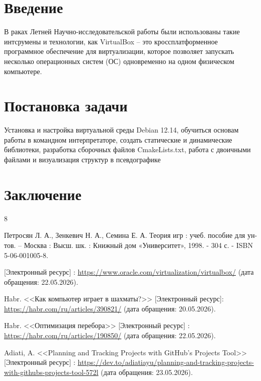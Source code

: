 \documentclass[14pt]{extreport}
\begin{document}
\newpage
\justifying
\newpage
\renewcommand\contentsname{\vspace{-3.2cm}\centering\LargeСодержание}
\tableofcontents
\thispagestyle{empty}
\newpage
{\centering\section*{Введение}}
В раках Летней Научно-исследовательской работы были использованы такие интсрумены и технологии, как VirtualBox -- это кроссплатформенное программное обеспечение для виртуализации, которое позволяет запускать несколько операционных систем (ОС) одновременно на одном физическом компьютере.
\newpage
{\centering\section{Постановка задачи}}
Установка и настройка виртуальной среды Debian 12.14, обучиться основам работы в командном интерпретаторе, создать статические и динамические библиотеки, разработка сборочных файлов CmakeLists.txt, работа с двоичными файлами и визуализация структур в псевдографике 
\newpage
{\centering\section*{Заключение}}

\newpage
\renewcommand{\bibname}{\vspace{-3.2cm}\centering\LargeСписок используемых источников}
\begin{thebibliography}{8}

Петросян Л. А., Зенкевич Н. А., Семина Е. А. Теория игр : учеб. пособие для ун-тов. -- Москва : Высш. шк. : Книжный дом «Университет», 1998. - 304 с. - ISBN 5-06-001005-8.

[Электронный ресурс] : 
\href{https://www.oracle.com/virtualization/virtualbox/}{https://www.oracle.com/virtualization/virtualbox/} 
(дата обращения: 22.05.2026).

Habr. <<Как компьютер играет в шахматы?>> [Электронный ресурс]: 
\href{https://habr.com/ru/articles/390821/}{https://habr.com/ru/articles/390821/} 
(дата обращения: 20.05.2026).

Habr. <<Оптимизация перебора>> [Электронный ресурс] : 
\href{https://habr.com/ru/articles/190850/}{https://habr.com/ru/articles/190850/} 
(дата обращения: 22.05.2026).

Adiati, A. <<Planning and Tracking Projects with GitHub's Projects Tool>> [Электронный ресурс] : 
\href{https://dev.to/adiatiayu/planning-and-tracking-projects-with-githubs-projects-tool-572l}{https://dev.to/adiatiayu/planning-and-tracking-projects-with-githubs-projects-tool-572l} 
(дата обращения: 23.05.2026).

\end{thebibliography}
\end{document}
